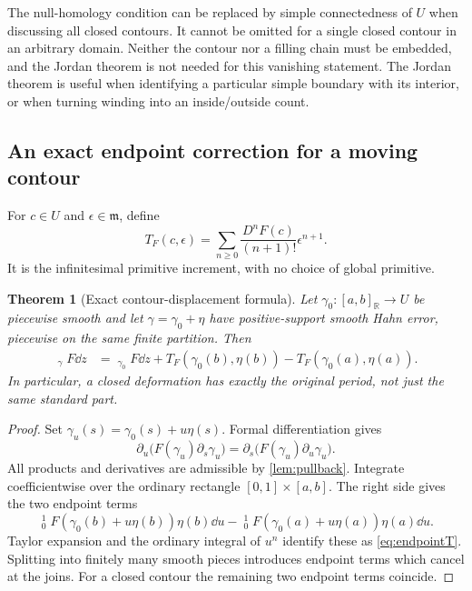 \documentclass[11pt,letterpaper]{article}
\newtheorem{theorem}{Theorem}[section]
\theoremstyle{definition}
\theoremstyle{remark}
\newcommand{\R}{\mathbb R}\newcommand{\C}{\mathbb C}\newcommand{\Q}{\mathbb Q}
\newcommand{\m}{\mathfrak m}\newcommand{\st}{\operatorname{st}}
\newcommand{\HInt}{\mathop{\int^{\!H}}\nolimits}
\numberwithin{equation}{section}
\begin{document}
The null-homology condition can be replaced by simple connectedness of $U$ when discussing all closed contours. It cannot be omitted for a single closed contour in an arbitrary domain. Neither the contour nor a filling chain must be embedded, and the Jordan theorem is not needed for this vanishing statement. The Jordan theorem is useful when identifying a particular simple boundary with its interior, or when turning winding into an inside/outside count.

\subsection{An exact endpoint correction for a moving contour}
For $c\in U$ and $\epsilon\in\m$, define
\begin{equation}\label{eq:endpointT}
 T_F(c,\epsilon)=\sum_{n\ge0}
 \frac{D^nF(c)}{(n+1)!}\epsilon^{n+1}.
\end{equation}
It is the infinitesimal primitive increment, with no choice of global primitive.

\begin{theorem}[Exact contour-displacement formula]\label{thm:displacement}
Let $\gamma_0:[a,b]_{\R}\to U$ be piecewise smooth and let $\gamma=\gamma_0+\eta$ have positive-support smooth Hahn error, piecewise on the same finite partition. Then
\begin{align}\label{eq:displacement}
 \HInt_\gamma F\dd z
 &=\HInt_{\gamma_0}F\dd z
 +T_F(\gamma_0(b),\eta(b))
 -T_F(\gamma_0(a),\eta(a)).
\end{align}
In particular, a closed deformation has exactly the original period, not just the same standard part.
\end{theorem}
\begin{proof}
Set $\gamma_u(s)=\gamma_0(s)+u\eta(s)$. Formal differentiation gives
\[
 \partial_u\bigl(F(\gamma_u)\partial_s\gamma_u\bigr)
 =\partial_s\bigl(F(\gamma_u)\partial_u\gamma_u\bigr).
\]
All products and derivatives are admissible by \cref{lem:pullback}. Integrate coefficientwise over the ordinary rectangle $[0,1]\times[a,b]$. The right side gives the two endpoint terms
\[
 \HInt_0^1 F(\gamma_0(b)+u\eta(b))\eta(b)\dd u
 -\HInt_0^1 F(\gamma_0(a)+u\eta(a))\eta(a)\dd u.
\]
Taylor expansion and the ordinary integral of $u^n$ identify these as \eqref{eq:endpointT}. Splitting into finitely many smooth pieces introduces endpoint terms which cancel at the joins. For a closed contour the remaining two endpoint terms coincide.
\end{proof}
\end{document}
